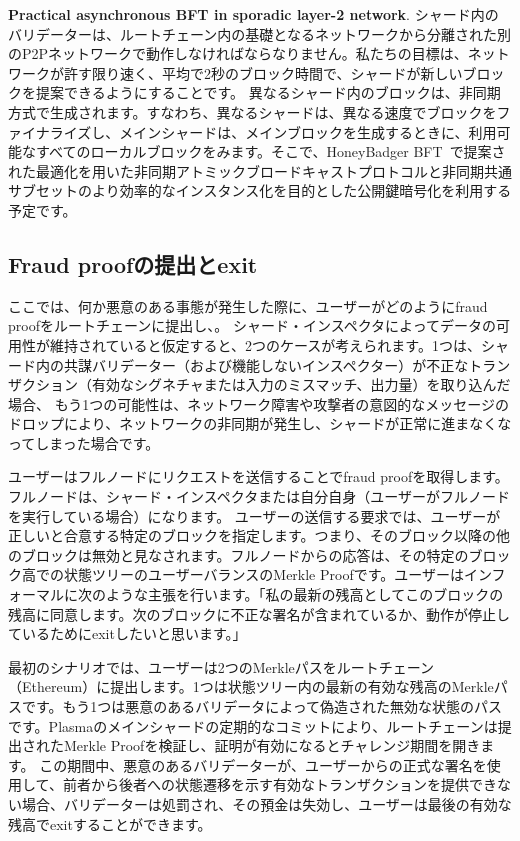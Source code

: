 \textbf{Practical asynchronous BFT in sporadic layer-2 network}.
シャード内のバリデーターは、ルートチェーン内の基礎となるネットワークから分離された別のP2Pネットワークで動作しなければならなりません。私たちの目標は、ネットワークが許す限り速く、平均で2秒のブロック時間で、シャードが新しいブロックを提案できるようにすることです。 異なるシャード内のブロックは、非同期方式で生成されます。すなわち、異なるシャードは、異なる速度でブロックをファイナライズし、メインシャードは、メインブロックを生成するときに、利用可能なすべてのローカルブロックをみます。そこで、HoneyBadger BFT~\cite{honeybadger}で提案された最適化を用いた非同期アトミックブロードキャストプロトコルと非同期共通サブセットのより効率的なインスタンス化を目的とした公開鍵暗号化を利用する予定です。

\subsection{Fraud proofの提出とexit}
ここでは、何か悪意のある事態が発生した際に、ユーザーがどのようにfraud proofをルートチェーンに提出し、。 シャード・インスペクタによってデータの可用性が維持されていると仮定すると、2つのケースが考えられます。1つは、シャード内の共謀バリデーター（および機能しないインスペクター）が不正なトランザクション（有効なシグネチャまたは入力のミスマッチ、出力量）を取り込んだ場合、 もう1つの可能性は、ネットワーク障害や攻撃者の意図的なメッセージのドロップにより、ネットワークの非同期が発生し、シャードが正常に進まなくなってしまった場合です。

ユーザーはフルノードにリクエストを送信することでfraud proofを取得します。フルノードは、シャード・インスペクタまたは自分自身（ユーザーがフルノードを実行している場合）になります。 ユーザーの送信する要求では、ユーザーが正しいと合意する特定のブロックを指定します。つまり、そのブロック以降の他のブロックは無効と見なされます。フルノードからの応答は、その特定のブロック高での状態ツリーのユーザーバランスのMerkle Proofです。ユーザーはインフォーマルに次のような主張を行います。「私の最新の残高としてこのブロックの残高に同意します。次のブロックに不正な署名が含まれているか、動作が停止しているためにexitしたいと思います。」

最初のシナリオでは、ユーザーは2つのMerkleパスをルートチェーン（Ethereum）に提出します。1つは状態ツリー内の最新の有効な残高のMerkleパスです。もう1つは悪意のあるバリデータによって偽造された無効な状態のパスです。Plasmaのメインシャードの定期的なコミットにより、ルートチェーンは提出されたMerkle Proofを検証し、証明が有効になるとチャレンジ期間を開きます。 この期間中、悪意のあるバリデーターが、ユーザーからの正式な署名を使用して、前者から後者への状態遷移を示す有効なトランザクションを提供できない場合、バリデーターは処罰され、その預金は失効し、ユーザーは最後の有効な残高でexitすることができます。

